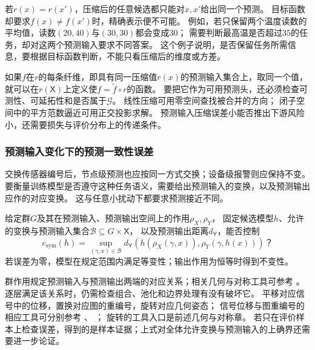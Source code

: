 若$r(x)=r(x')$，压缩后的任意候选都只能对$x,x'$给出同一个预测。
目标函数却要求$f(x)\ne f(x')$时，精确表示便不可能。
例如，若只保留两个温度读数的平均值，读数$(20,40)$与$(30,30)$都会变成$30$；
需要判断最高温是否超过$35$的任务，却对这两个预测输入要求不同答案。
这个例子说明，是否保留任务所需信息，要根据目标函数判断，不能只看压缩后的维度或方差。

如果$f$在$r$的每条纤维，即具有同一压缩值$r(x)$的预测输入集合上，取同一个值，就可以在$r(\mathsf X)$上定义使$f=\widetilde f\circ r$的函数。
要把它作为可用预测头，还必须检查可测性、可延拓性和是否属于$\mathcal G$。
线性压缩可用零空间查找被合并的方向；
闭子空间中的平方范数逼近可用正交投影求解。
预测输入压缩误差小能否推出下游风险小，还需要损失与评价分布上的传递条件。

\subsubsection{预测输入变化下的预测一致性误差}
\label{sec:future-analysis-structural-property}

交换传感器编号后，节点级预测也应按同一方式交换；设备级报警则应保持不变。
要衡量训练模型是否遵守这种任务语义，需要给出预测输入的变换，以及预测输出应作的对应变换。
这与任意小扰动下都要求预测接近不同。

\begin{mathproblem}[预测输入变换与预测输出对应的误差]
  \label{question:future-structural-property}
  给定群$G$及其在预测输入、预测输出空间上的作用$\rho_X,\rho_Y$，
  固定候选模型$h$、允许的变换与预测输入集合$\mathcal B\subseteq G\times\mathsf X$，
  以及预测输出距离$d_{\mathsf Y}$，能否控制
  \[
    e_{\mathrm{sym}}(h)=\sup_{(\gamma,x)\in\mathcal B}
    d_{\mathsf Y}\!\left(h(\rho_X(\gamma,x)),\rho_Y(\gamma,h(x))\right)\text{？}
  \]
  若误差为零，模型在规定范围内满足等变性；输出作用为恒等时得到不变性。
\end{mathproblem}

群作用规定预测输入与预测输出两端的对应关系；相关几何与对称工具可参考
。
逐层满足该关系时，仍需检查组合、池化和边界处理有没有破坏它。
平移对应信号中的位移，置换对应图的重编号，旋转对应几何姿态；
信号位移与图重编号的相应工具可分别参考
、
；
旋转的工具入口是前述几何与对称章。
若只在评价样本上检查误差，得到的是样本证据；上式对全体允许变换与预测输入的上确界还需要进一步论证。

